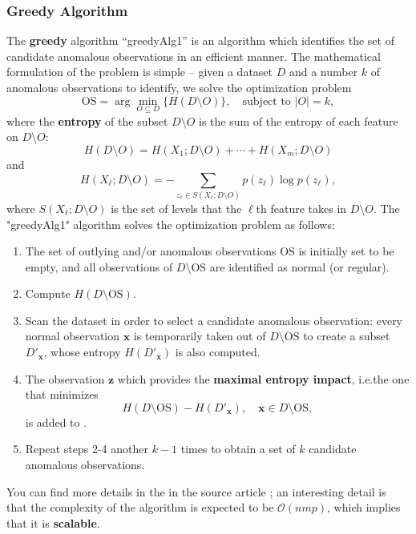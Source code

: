 \subsubsection*{Greedy Algorithm}
The \textbf{greedy} algorithm ``greedyAlg1'' is an  algorithm   which identifies the set  of candidate anomalous observations in an efficient manner. 
\newline\newline The mathematical formulation of the problem is simple -- given a dataset $D$ and a number $k$ of anomalous observations to identify, we solve the optimization problem 
$$\text{OS}=\arg\min_{O\subseteq D} \{H(D\setminus O)\}, \quad \text{subject to }|O|=k,$$
where the \textbf{entropy} of the subset  $D\setminus O$ is the sum of the entropy of each feature on $D\setminus O$:
$$H(D\setminus O)=H(X_1;D\setminus O)+\cdots + H(X_m;D\setminus O)$$ and  $$H(X_{\ell};D\setminus O)=-\!\!\!\!\!\!\!\!\!\!\!\sum_{z_{\ell}\in S(X_{\ell};D\setminus O)}\!\!\!\!\!\!\!\!\!\!\! p(z_{\ell})\log p(z_{\ell}),$$ where $S(X_{\ell};D\setminus O)$ is the set of levels that the $\ell$th feature takes in  $D\setminus O$.
\newline\newline The "greedyAlg1" algorithm solves the optimization problem as follows:
\begin{enumerate}
\item The set of outlying and/or anomalous observations $\text{OS}$ is initially set to be empty, and all observations of $D\setminus \text{OS}$ are identified as normal (or regular).
\item Compute $H(D\setminus \text{OS})$. 

\item Scan the dataset in order to select a candidate anomalous observation: every normal observation $\mathbf{x}$ is temporarily taken out of $D\setminus \text{OS}$ to create a subset $D'_{\mathbf{x}}$, whose entropy $H(D'_{\mathbf{x}})$ is also computed.
\item The observation $\mathbf{z}$ which provides the \textbf{maximal entropy impact}, i.e.\@ the one that minimizes $$H(D\setminus \text{OS})-H(D'_{\mathbf{x}}),\quad \mathbf{x}\in D\setminus \text{OS}, $$ is added to  .

\item Repeat steps 2-4 another $k-1$ times to obtain a set  of $k$ candidate anomalous observations.
\end{enumerate}

\noindent You can find more details in the in the source article \cite{Article_source}; an interesting detail is that the complexity of the algorithm is expected to be $\mathcal{O}(nmp)$, which implies that it is \textbf{scalable}.